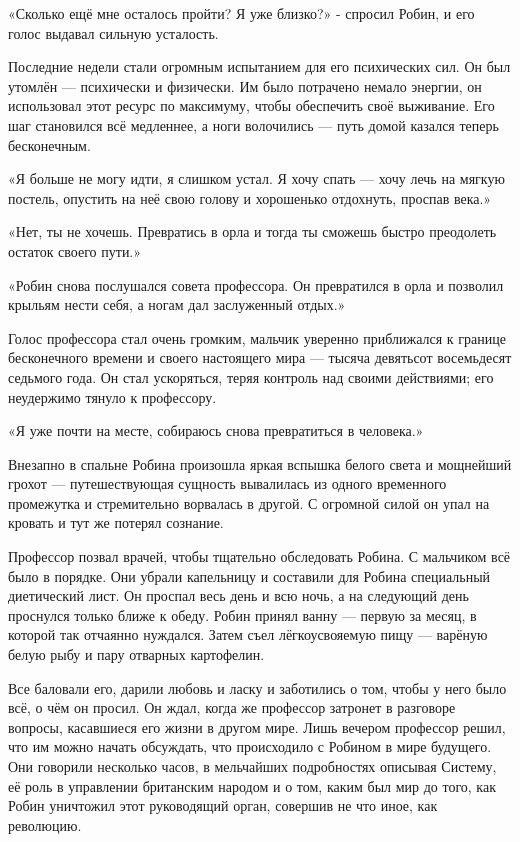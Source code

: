 \documentclass[a4paper,12pt]{book}
\begin{document}
\par
«Сколько ещё мне осталось пройти? Я уже близко?» - спросил Робин, и его голос выдавал сильную усталость.
\par
Последние недели стали огромным испытанием для его психических сил. Он был утомлён — психически и физически. Им было потрачено немало энергии, он использовал этот ресурс по максимуму, чтобы обеспечить своё выживание. Его шаг становился всё медленнее, а ноги волочились — путь домой казался теперь бесконечным.
\par
«Я больше не могу идти, я слишком устал. Я хочу спать — хочу лечь на мягкую постель, опустить на неё свою голову и хорошенько отдохнуть, проспав века.»
\par
«Нет, ты не хочешь. Превратись в орла и тогда ты сможешь быстро преодолеть остаток своего пути.» 
\par
«Робин снова послушался совета профессора. Он превратился в орла и позволил крыльям нести себя, а ногам дал заслуженный отдых.»
\par
Голос профессора стал очень громким, мальчик уверенно приближался к границе бесконечного времени и своего настоящего мира — тысяча девятьсот восемьдесят седьмого года. Он стал ускоряться, теряя контроль над своими действиями; его неудержимо тянуло к профессору.
\par
«Я уже почти на месте, собираюсь снова превратиться в человека.»
\par
Внезапно в спальне Робина произошла яркая вспышка белого света и мощнейший грохот — путешествующая сущность вывалилась из одного временного промежутка и стремительно ворвалась в другой. С огромной силой он упал на кровать и тут же потерял сознание.\\
\par
Профессор позвал врачей, чтобы тщательно обследовать Робина. С мальчиком всё было в порядке. Они убрали капельницу и составили для Робина специальный диетический лист. Он проспал весь день и всю ночь, а на следующий день проснулся только ближе к обеду. Робин принял ванну — первую за месяц, в которой так отчаянно нуждался. Затем съел лёгкоусвояемую пищу — варёную белую рыбу и пару отварных картофелин.
\par
Все баловали его, дарили любовь и ласку и заботились о том, чтобы у него было всё, о чём он просил. Он ждал, когда же профессор затронет в разговоре вопросы, касавшиеся его жизни в другом мире. Лишь вечером профессор решил, что им можно начать обсуждать, что происходило с Робином в мире будущего. Они говорили несколько часов, в мельчайших подробностях описывая Систему, её роль в управлении британским народом и о том, каким был мир до того, как Робин уничтожил этот руководящий орган, совершив не что иное, как революцию.
\end{document}
